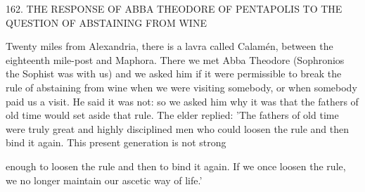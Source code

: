 162.
THE RESPONSE OF ABBA THEODORE
OF PENTAPOLIS TO THE QUESTION
OF ABSTAINING FROM WINE

Twenty miles from Alexandria, there is a lavra called Calamén,
between the eighteenth mile-post and Maphora.
There we met Abba
Theodore (Sophronios the Sophist was with us) and we asked him
if it were permissible to break the rule of abstaining from wine when
we were visiting somebody, or when somebody paid us a visit.
He
said it was not: so we asked him why it was that the fathers of old
time would set aside that rule.
The elder replied: 'The fathers of old
time were truly great and highly disciplined men who could loosen
the rule and then bind it again.
This present generation is not strong

enough to loosen the rule and then to bind it again.
If we once
loosen the rule, we no longer maintain our ascetic way of life.'

